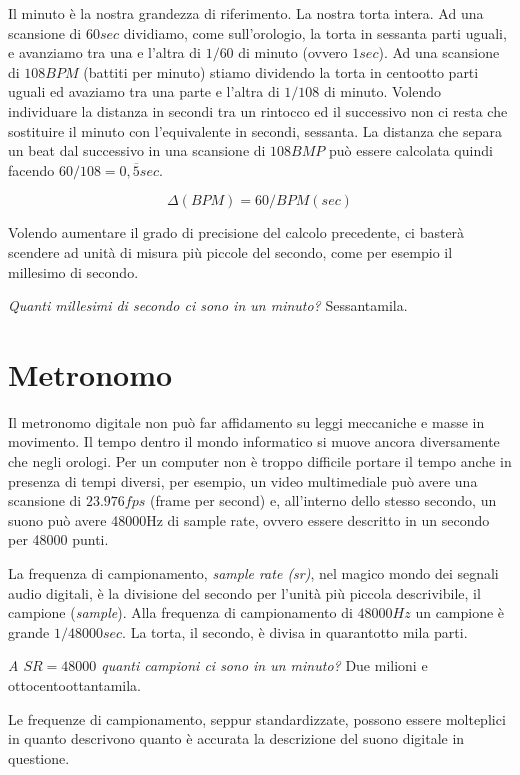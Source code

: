 Il minuto è la nostra grandezza di riferimento. La nostra torta intera. Ad una
scansione di $60sec$ dividiamo, come sull'orologio, la torta in sessanta parti
uguali, e avanziamo tra una e l'altra di $1/60$ di minuto (ovvero $1sec$).
Ad una scansione di $108BPM$ (battiti per minuto) stiamo dividendo la torta in
centootto parti uguali ed avaziamo tra una parte e l'altra di $1/108$ di minuto.
Volendo individuare la distanza in secondi tra un rintocco ed il successivo non
ci resta che sostituire il minuto con l'equivalente in secondi, sessanta. La
distanza che separa un beat dal successivo in una scansione di $108BMP$ può
essere calcolata quindi facendo $60/108=0,\overline{5}sec$.

\begin{equation}
\Delta(BPM) = 60/BPM (sec)
\end{equation}

Volendo aumentare il grado di precisione del calcolo precedente, ci basterà scendere
ad unità di misura più piccole del secondo, come per esempio il millesimo di secondo.

\emph{Quanti millesimi di secondo ci sono in un minuto?} Sessantamila.

\section{Metronomo}

Il metronomo digitale non può far affidamento su leggi meccaniche e masse in
movimento. Il tempo dentro il mondo informatico si muove ancora diversamente che
negli orologi. Per un computer non è troppo difficile portare il tempo anche in
presenza di tempi diversi, per esempio, un video multimediale può avere una scansione
di $23.976fps$ (frame per second) e, all'interno dello stesso secondo, un suono
può avere 48000Hz di sample rate, ovvero essere descritto in un secondo per 48000 punti.

La frequenza di campionamento, \emph{sample rate (sr)}, nel magico mondo dei
segnali audio digitali, è la divisione del secondo per l'unità più piccola descrivibile,
il campione (\emph{sample}). Alla frequenza di campionamento di $48000Hz$ un campione
è grande $1/48000sec$. La torta, il secondo, è divisa in quarantotto mila parti.

\emph{A $SR=48000$ quanti campioni ci sono in un minuto?} Due milioni e ottocentoottantamila.

Le frequenze di campionamento, seppur standardizzate, possono essere molteplici in
quanto descrivono quanto è accurata la descrizione del suono digitale in questione.

